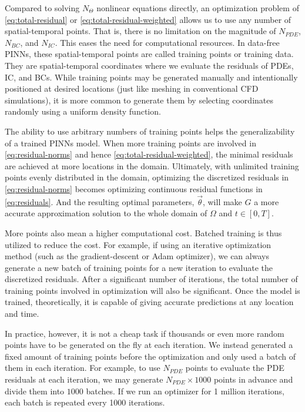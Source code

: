 
Compared to solving $N_\Theta$ nonlinear equations directly, an optimization problem of \eqref{eq:total-residual} or \eqref{eq:total-residual-weighted} allows us to use any number of spatial-temporal points.
That is, there is no limitation on the magnitude of $N_{PDE}$, $N_{BC}$, and $N_{IC}$.
This eases the need for computational resources.
In data-free PINNs, these spatial-temporal points are called training points or training data.
They are spatial-temporal coordinates where we evaluate the residuals of PDEs, IC, and BCs.
While training points may be generated manually and intentionally positioned at desired locations (just like meshing in conventional CFD simulations), it is more common to generate them by selecting coordinates randomly using a uniform density function. 

The ability to use arbitrary numbers of training points helps the generalizability of a trained PINNs model.
When more training points are involved in \eqref{eq:residual-norms} and hence \eqref{eq:total-residual-weighted}, the minimal residuals are achieved at more locations in the domain. 
Ultimately, with unlimited training points evenly distributed in the domain, optimizing the discretized residuals in \eqref{eq:residual-norms} becomes optimizing continuous residual functions in \eqref{eq:residuals}. 
And the resulting optimal parameters, $\vec{\theta}$, will make $G$ a more accurate approximation solution to the whole domain of $\Omega$ and $t\in[0, T]$.

More points also mean a higher computational cost.
Batched training is thus utilized to reduce the cost.
For example, if using an iterative optimization method (such as the gradient-descent or Adam optimizer), we can always generate a new batch of training points for a new iteration to evaluate the discretized residuals.
After a significant number of iterations, the total number of training points involved in optimization will also be significant.
Once the model is trained, theoretically, it is capable of giving accurate predictions at any location and time.

In practice, however, it is not a cheap task if thousands or even more random points have to be generated on the fly at each iteration.
We instead generated a fixed amount of training points before the optimization and only used a batch of them in each iteration.
For example, to use $N_{PDE}$ points to evaluate the PDE residuals at each iteration, we may generate $N_{PDE}\times 1000$ points in advance and divide them into $1000$ batches.
If we run an optimizer for 1 million iterations, each batch is repeated every 1000 iterations.

